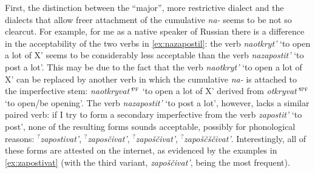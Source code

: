 First, the distinction between the ``major'', more restrictive dialect and the dialects that allow freer attachment of the cumulative  \textit{na-}   seems to be not so clearcut. For example, for me as a native speaker of Russian there is a difference in the acceptability of the two verbs in \ref{ex:nazapostil}: the verb \textit{naotkryt'} `to open a lot of X' seems to be considerably less acceptable than the verb \textit{nazapostit'} `to post a lot'. This may be due to the fact that the verb \textit{naotkryt'} `to open a lot of X' can be replaced by another verb in which the cumulative  \textit{na-}   is attached to the imperfective stem: \textit{naotkryvat'}$^{\textsc{pf}}$ `to open a lot of X' derived from \textit{otkryvat'}$^{\textsc{ipf}}$ `to open/be opening'. The verb \textit{nazapostit'} `to post a lot', however, lacks a similar paired verb: if I try to form a secondary imperfective  from the verb \textit{zapostit'} `to post', none of the resulting forms sounds acceptable, possibly for phonological reasons: $^?$\textit{zapostivat'}, $^?$\textit{zapos\v{c}ivat'}, $^?$\textit{zapo\v{s}\v{c}ivat'}, $^?$\textit{zapo\v{s}\v{c}\v{s}\v{c}ivat'}. Interestingly, all of these forms are attested on the internet, as evidenced by the examples in \ref{ex:zapostivat} (with the third variant, \textit{zapo\v{s}\v{c}ivat'}, being the most frequent).

